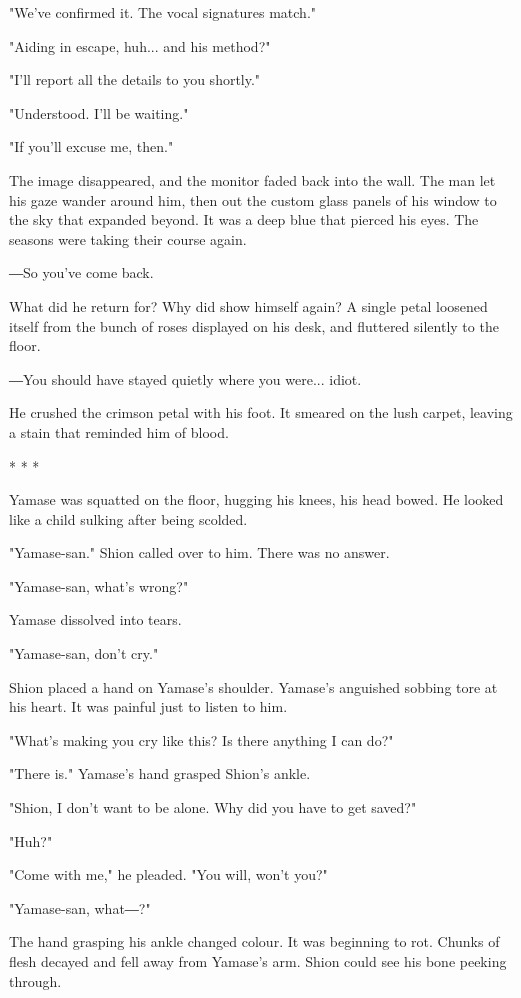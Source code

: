 "We've confirmed it. The vocal signatures match."

"Aiding in escape, huh... and his method?"

"I'll report all the details to you shortly."

"Understood. I'll be waiting."

"If you'll excuse me, then."

The image disappeared, and the monitor faded back into the wall. The man
let his gaze wander around him, then out the custom glass panels of his
window to the sky that expanded beyond. It was a deep blue that pierced
his eyes. The seasons were taking their course again.

―So you've come back.

What did he return for? Why did show himself again? A single petal
loosened itself from the bunch of roses displayed on his desk, and
fluttered silently to the floor.

―You should have stayed quietly where you were... idiot.

He crushed the crimson petal with his foot. It smeared on the lush
carpet, leaving a stain that reminded him of blood.

* * *

Yamase was squatted on the floor, hugging his knees, his head bowed. He
looked like a child sulking after being scolded.

"Yamase-san." Shion called over to him. There was no answer.

"Yamase-san, what's wrong?"

Yamase dissolved into tears.

"Yamase-san, don't cry."

Shion placed a hand on Yamase's shoulder. Yamase's anguished sobbing
tore at his heart. It was painful just to listen to him.

"What's making you cry like this? Is there anything I can do?"

"There is." Yamase's hand grasped Shion's ankle.

"Shion, I don't want to be alone. Why did you have to get saved?"

"Huh?"

"Come with me," he pleaded. "You will, won't you?"

"Yamase-san, what―?"

The hand grasping his ankle changed colour. It was beginning to rot.
Chunks of flesh decayed and fell away from Yamase's arm. Shion could see
his bone peeking through.


